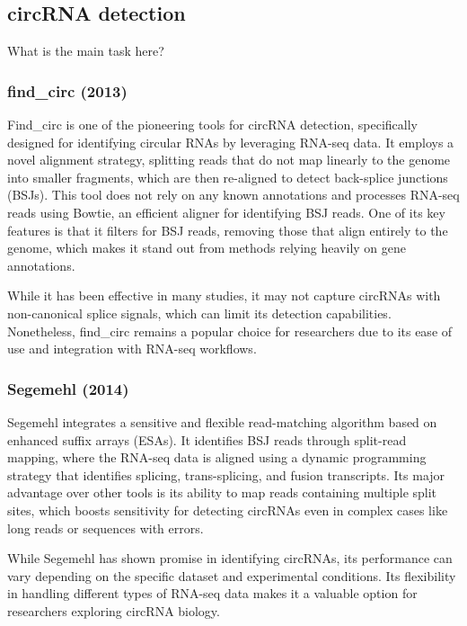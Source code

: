 \subsection{circRNA detection}
\label{subsec:circrna_detection}
What is the main task here?

\subsubsection{find\_circ (2013)\supercite{memczak_circular_2013}}
Find\_circ is one of the pioneering tools for circRNA detection, specifically
designed for identifying circular RNAs by leveraging RNA-seq data.
It employs a novel alignment strategy, splitting reads that do not map linearly
to the genome into smaller fragments, which are then re-aligned to detect
back-splice junctions (BSJs)\supercite{memczak_circular_2013}.
This tool does not rely on any known annotations and processes RNA-seq reads
using Bowtie, an efficient aligner for identifying BSJ reads.
One of its key features is that it filters for BSJ reads, removing those that
align entirely to the genome, which makes it stand out from methods relying
heavily on gene annotations\supercite{memczak_circular_2013}.

While it has been effective in many studies, it may not capture circRNAs with
non-canonical splice signals, which can limit its detection
capabilities\supercite{sekar_circular_2018,liu_prkra_2022}.
Nonetheless, find\_circ remains a popular choice for researchers due to its
ease of use and integration with RNA-seq workflows.

\subsubsection{Segemehl (2014)\supercite{hoffmann_multi-split_2014}}
Segemehl integrates a sensitive and flexible read-matching algorithm based on
enhanced suffix arrays (ESAs).
It identifies BSJ reads through split-read mapping, where the RNA-seq data is
aligned using a dynamic programming strategy that identifies splicing,
trans-splicing, and fusion transcripts.
Its major advantage over other tools is its ability to map reads containing
multiple split sites, which boosts sensitivity for detecting circRNAs even in
complex cases like long reads or sequences with
errors\supercite{hoffmann_multi-split_2014}.

While Segemehl has shown promise in identifying circRNAs, its performance can
vary depending on the specific dataset and experimental
conditions\supercite{gao_ciri_2015,zeng_comprehensive_2017}.
Its flexibility in handling different types of RNA-seq data makes it a valuable
option for researchers exploring circRNA biology.

